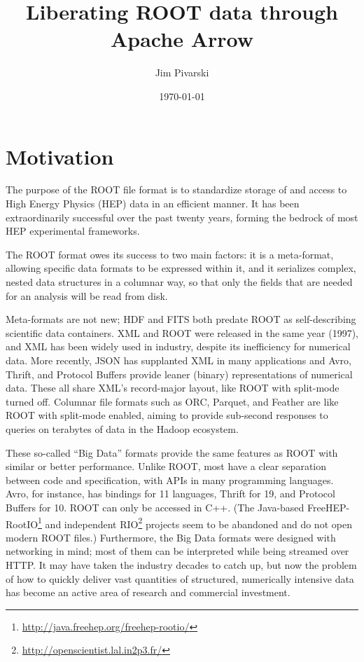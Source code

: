\documentclass{article}
\title{Liberating ROOT data through Apache Arrow}
\author{Jim Pivarski}
\date{\today}
\begin{document}
\maketitle

\section*{Motivation}

The purpose of the ROOT file format is to standardize storage of and access to High Energy Physics (HEP) data in an efficient manner. It has been extraordinarily successful over the past twenty years, forming the bedrock of most HEP experimental frameworks.

The ROOT format owes its success to two main factors: it is a meta-format, allowing specific data formats to be expressed within it, and it serializes complex, nested data structures in a columnar way, so that only the fields that are needed for an analysis will be read from disk.

Meta-formats are not new; HDF and FITS both predate ROOT as self-describing scientific data containers. XML and ROOT were released in the same year (1997), and XML has been widely used in industry, despite its inefficiency for numerical data. More recently, JSON has supplanted XML in many applications and Avro, Thrift, and Protocol Buffers provide leaner (binary) representations of numerical data. These all share XML's record-major layout, like ROOT with split-mode turned off. Columnar file formats such as ORC, Parquet, and Feather are like ROOT with split-mode enabled, aiming to provide sub-second responses to queries on terabytes of data in the Hadoop ecosystem.

These so-called ``Big Data'' formats provide the same features as ROOT with similar or better performance. Unlike ROOT, most have a clear separation between code and specification, with APIs in many programming languages. Avro, for instance, has bindings for 11 languages, Thrift for 19, and Protocol Buffers for 10. ROOT can only be accessed in C++. (The Java-based FreeHEP-RootIO\footnote{\url{http://java.freehep.org/freehep-rootio/}} and independent RIO\footnote{\url{http://openscientist.lal.in2p3.fr/}} projects seem to be abandoned and do not open modern ROOT files.) Furthermore, the Big Data formats were designed with networking in mind; most of them can be interpreted while being streamed over HTTP. It may have taken the industry decades to catch up, but now the problem of how to quickly deliver vast quantities of structured, numerically intensive data has become an active area of research and commercial investment.
\end{document}
